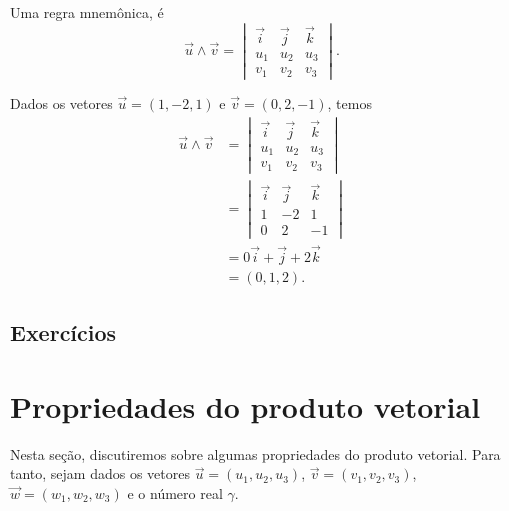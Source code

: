 \begin{obs}
  Uma regra mnemônica, é
  \begin{equation}
    \vec{u}\land\vec{v} =
    \begin{vmatrix}
      \vec{i} & \vec{j} & \vec{k} \\
      u_1 & u_2 & u_3 \\
      v_1 & v_2 & v_3
    \end{vmatrix}.
  \end{equation}
\end{obs}

\begin{ex}
  Dados os vetores $\vec{u} = (1,-2,1)$ e $\vec{v} = (0,2,-1)$, temos
  \begin{align}
    \vec{u}\land\vec{v} &=
                          \begin{vmatrix}
                            \vec{i} & \vec{j} & \vec{k} \\
                            u_1 & u_2 & u_3 \\
                            v_1 & v_2 & v_3
                          \end{vmatrix} \\
                        &=
                          \begin{vmatrix}
                            \vec{i} & \vec{j} & \vec{k} \\
                            1       & -2      & 1 \\
                            0       & 2       & -1
                          \end{vmatrix} \\
                        &= 0\vec{i} + \vec{j} + 2\vec{k}\\
                        &= (0,1,2).
  \end{align}
\end{ex}

\subsection{Exercícios}

\emconstrucao

\section{Propriedades do produto vetorial}\label{cap_prodvet_sec_prop}

Nesta seção, discutiremos sobre algumas propriedades do produto vetorial. Para tanto, sejam dados os vetores $\vec{u} = (u_1,u_2,u_3)$, $\vec{v}=(v_1,v_2,v_3)$, $\vec{w}=(w_1,w_2,w_3)$ e o número real $\gamma$.

